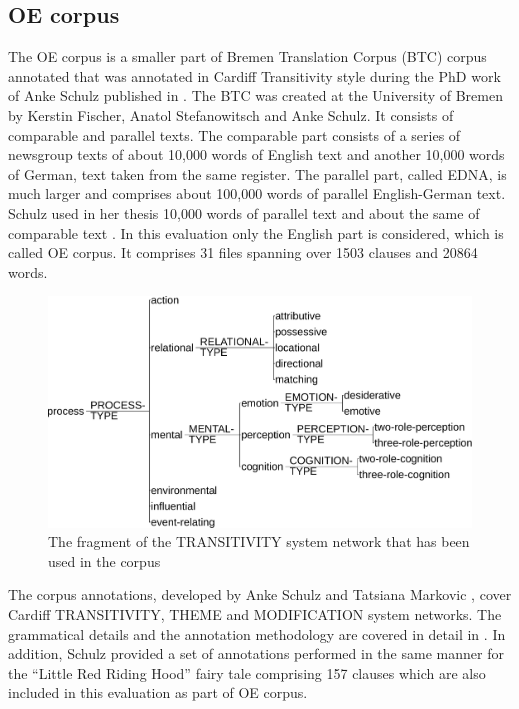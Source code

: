 \subsection{OE corpus}

    The OE corpus is a smaller part of Bremen Translation Corpus (BTC) corpus annotated that was annotated in Cardiff Transitivity style during the PhD work of Anke Schulz published in \citeyear{schulz2015me}. The BTC was created at the University of Bremen by Kerstin Fischer, Anatol Stefanowitsch and Anke Schulz. It consists of comparable and parallel texts. The comparable part consists of a series of newsgroup texts of about 10,000 words of English text and another 10,000 words of German, text taken from the same register. The parallel part, called EDNA, is much larger and comprises about 100,000 words of parallel English-German text. Schulz used in her thesis 10,000 words of parallel text and about the same of comparable text \citep[31]{schulz2015me}. In this evaluation only the English part is considered, which is called OE corpus. It comprises 31 files spanning over 1503 clauses and 20864 words. 
    
    \begin{figure}[!h]
        \centering
        \includegraphics[width=.75\textwidth]{Figures/Evaluation/trans-simplified.pdf}
        \caption{The fragment of the TRANSITIVITY system network that has been used in the corpus}
        \label{fig:transitivity-simplified}
    \end{figure}

    The corpus annotations, developed by Anke Schulz and Tatsiana Markovic \citep[36]{schulz2015me}, cover Cardiff TRANSITIVITY, THEME and MODIFICATION system networks. The grammatical details and the annotation methodology are covered in detail in \citet[48-161]{schulz2015me}. In addition, Schulz provided a set of annotations performed in the same manner for the ``Little Red Riding Hood'' fairy tale comprising 157 clauses which are also included in this evaluation as part of OE corpus.
    
